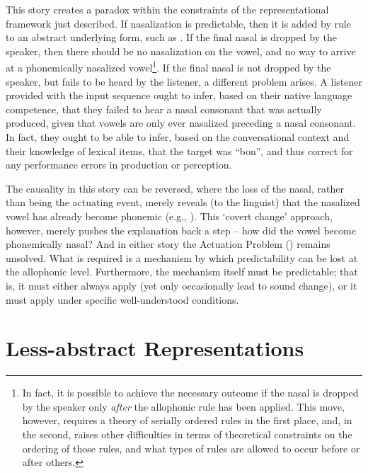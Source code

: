 This story creates a paradox within the constraints of the representational
framework just described. If nasalization is predictable, then it
is added by rule to an abstract underlying form, such as .
If the final nasal is dropped by the speaker, then there should be
no nasalization on the vowel, and no way to arrive at a phonemically
nasalized vowel\footnote{In fact, it is possible to achieve the necessary outcome if the nasal
is dropped by the speaker only \emph{after} the allophonic rule has
been applied. This move, however, requires a theory of serially ordered
rules in the first place, and, in the second, raises other difficulties
in terms of theoretical constraints on the ordering of those rules,
and what types of rules are allowed to occur before or after others.}. If the final nasal is not dropped by the speaker, but fails to be
heard by the listener, a different problem arises. A listener provided
with the input sequence \textipa{[bɔ̃]} ought to infer, based on
their native language competence, that they failed to hear a nasal
consonant that was actually produced, given that vowels are only ever
nasalized preceding a nasal consonant. In fact, they ought to be able
to infer, based on the conversational context and their knowledge
of lexical items, that the target was “bon”, and thus correct
for any performance errors in production or perception.

The causality in this story can be reversed, where the loss of the
nasal, rather than being the actuating event, merely reveals (to the
linguist) that the nasalized vowel has already become phonemic (e.g.,
\citealt{Janda2003}). This `covert change' approach, however, merely
pushes the explanation back a step – how did the vowel become phonemically
nasal? And in either story the Actuation Problem (\citealt{Labov1968})
remains unsolved. What is required is a mechanism by which predictability
can be lost at the allophonic level. Furthermore, the mechanism itself
must be predictable; that is, it must either always apply (yet only
occasionally lead to sound change), or it must apply under specific
well-understood conditions.

\section{\label{sec:Less-abstract-Representations}Less-abstract Representations}

